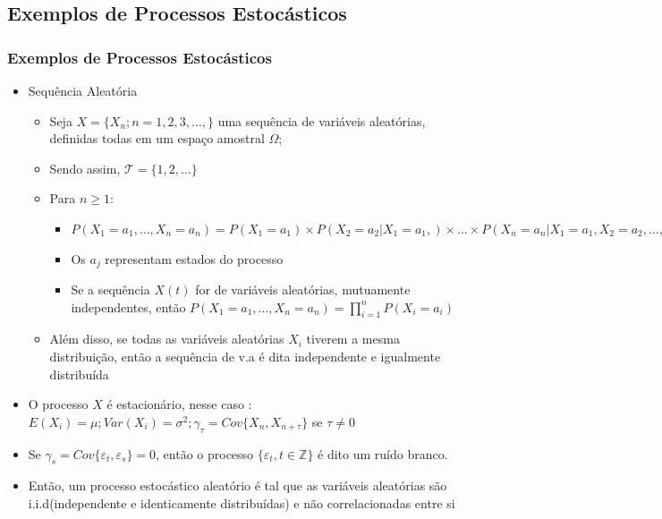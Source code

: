 \documentclass{beamer}
\begin{document}
\subsection{Exemplos de Processos Estocásticos}
\begin{frame}[allowframebreaks]
	\frametitle{Exemplos de Processos Estocásticos}
	\begin{itemize}
		\item<1->Sequência Aleatória
		\begin{itemize}
			\item<1-> Seja $X=\{ X_{n};n=1,2,3,\dots,\}$  uma sequência de variáveis aleatórias, definidas todas em um espaço amostral $\Omega$;
			\item<1-> Sendo assim,  $\mathcal{T}=\{1,2,\dots\}$
			\item<1-> Para $n \geq 1$:
			\begin{itemize}
				\item<1-> $\mathit{P}(X_{1}=a_{1},\dots,X_{n}=a_{n})=\mathit{P}(X_{1}=a_{1})\times\mathit{P}(X_{2}=a_{2}|X_{1}=a_{1},)\times \dots \times \mathit{P}(X_{n}=a_{n}| X_{1}=a_{1},X_{2}=a_{2},\dots,X_{n-1}=a_{n-1} )$ 
			\end{itemize} 
		\begin{itemize}
			\item<1-> Os $a_{j}$ representam estados do processo
			\item<1-> Se a sequência $X(t)$ for de variáveis aleatórias, mutuamente independentes, então
			$\mathit{P}(X_{1}=a_{1},\dots,X_{n}=a_{n}) = \prod_{i=1}^{n}\mathit{P}(X_{i}=a_{i})$ 
		\end{itemize}
		\item<1-> Além disso, se todas as variáveis aleatórias $X_{i}$ tiverem a mesma distribuição, então a sequência de v.a é dita independente e igualmente distribuída
		\end{itemize}
	\item<1-> O processo $X$ é estacionário, nesse caso : $\mathit{E}(X_{i})=\mu;  Var(X_{i})=\sigma^{2}; \gamma_{\tau}=Cov\{X_{n},X_{n+\tau}\}$ se $\tau \neq 0$
	\item<1-> Se $\gamma_{s}=Cov\{\varepsilon_{t},\varepsilon_{s}\}=0$, então o processo $\{\varepsilon_{t},t \in \mathbb{Z} \}$ é dito um ruído branco.
	\item<1-> Então, um processo estocástico aleatório é tal que as variáveis aleatórias são i.i.d(independente e identicamente distribuídas) e não correlacionadas entre si

\end{itemize}
\end{frame}
\end{document}
